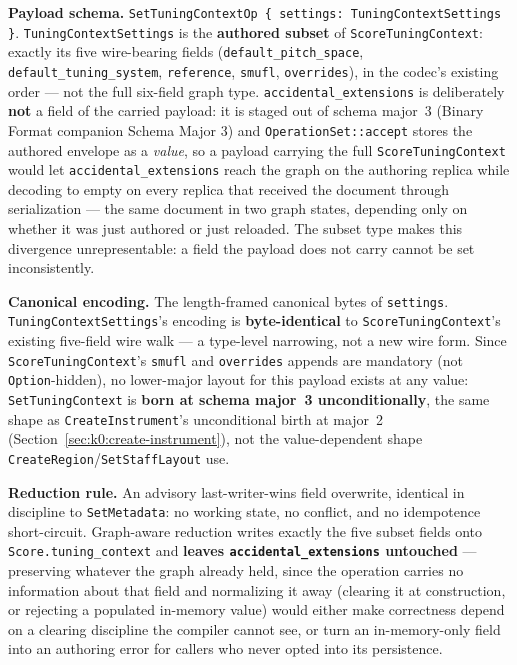 \documentclass[11pt,letterpaper]{report}
\newcommand{\sectionsc}[1]{{\addfontfeatures{Letters=SmallCaps}#1}}
\begin{document}
\textbf{Payload schema.} \texttt{SetTuningContextOp \{ settings:
TuningContextSettings \}}. \texttt{TuningContextSettings} is the
\textbf{authored subset} of \texttt{ScoreTuningContext}: exactly its five
wire-bearing fields (\texttt{default\_pitch\_space},
\texttt{default\_tuning\_system}, \texttt{reference}, \texttt{smufl},
\texttt{overrides}), in the codec's existing order --- not the full
six-field graph type. \texttt{accidental\_extensions} is deliberately
\textbf{not} a field of the carried payload: it is staged out of schema
major~3 (Binary Format companion \sectionsc{Schema Major 3}) and
\texttt{OperationSet::accept} stores the authored envelope as a
\emph{value}, so a payload carrying the full \texttt{ScoreTuningContext}
would let \texttt{accidental\_extensions} reach the graph on the authoring
replica while decoding to empty on every replica that received the
document through serialization --- the same document in two graph states,
depending only on whether it was just authored or just reloaded. The
subset type makes this divergence unrepresentable: a field the payload
does not carry cannot be set inconsistently.

\textbf{Canonical encoding.} The length-framed canonical bytes of
\texttt{settings}. \texttt{TuningContextSettings}'s encoding is
\textbf{byte-identical} to \texttt{ScoreTuningContext}'s existing
five-field wire walk --- a type-level narrowing, not a new wire form. Since
\texttt{ScoreTuningContext}'s \texttt{smufl} and \texttt{overrides} appends
are mandatory (not \texttt{Option}-hidden), no lower-major layout for this
payload exists at any value: \texttt{SetTuningContext} is \textbf{born at
schema major~3 unconditionally}, the same shape as \texttt{CreateInstrument}'s
unconditional birth at major~2 (Section~\ref{sec:k0:create-instrument}), not
the value-dependent shape \texttt{CreateRegion}/\texttt{SetStaffLayout} use.

\textbf{Reduction rule.} An advisory last-writer-wins field overwrite,
identical in discipline to \texttt{SetMetadata}: no working state, no
conflict, and no idempotence short-circuit. Graph-aware reduction writes
exactly the five subset fields onto \texttt{Score.tuning\_context} and
\textbf{leaves \texttt{accidental\_extensions} untouched} --- preserving
whatever the graph already held, since the operation carries no
information about that field and normalizing it away (clearing it at
construction, or rejecting a populated in-memory value) would either make
correctness depend on a clearing discipline the compiler cannot see, or
turn an in-memory-only field into an authoring error for callers who never
opted into its persistence.
\end{document}
